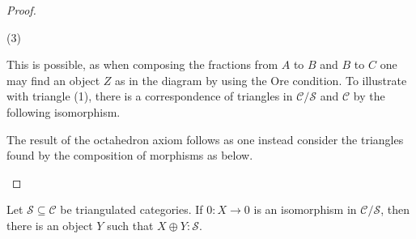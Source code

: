 \begin{proof}
\begin{center}
            (3)
        \end{center}
        This is possible, as when composing the fractions from $A$ to $B$ and $B$ to $C$ one may find an object $Z$ as in the diagram by using the Ore condition. To illustrate with triangle (1), there is a correspondence of triangles in $\mathcal{C}/\mathcal{S}$ and $\mathcal{C}$ by the following isomorphism.
        \begin{center}
        \end{center}
        The result of the octahedron axiom follows as one instead consider the triangles found by the composition of morphisms as below.
        \begin{center}
        \end{center}
    \end{proof}

    \begin{prop}
        Let $\mathcal{S}\subseteq\mathcal{C}$ be triangulated categories. If $0:X\rightarrow 0$ is an isomorphism in $\mathcal{C}/\mathcal{S}$, then there is an object $Y$ such that $X\oplus Y:\mathcal{S}$.
    \end{prop}

